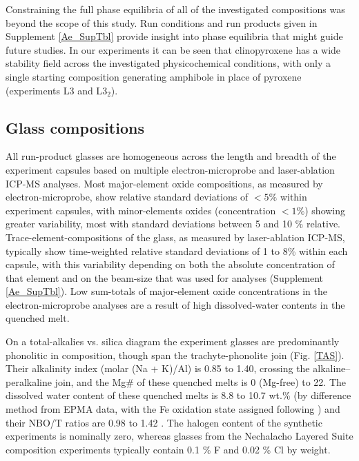 \documentclass[final,authoryear,3p,times,twocolumn]{elsarticle}
\begin{document}
Constraining the full phase equilibria of all of the investigated compositions was beyond the scope of this study. Run conditions and run products given in Supplement \ref{Ae_SupTbl} provide insight into phase equilibria that might guide future studies. In our experiments it can be seen that clinopyroxene has a wide stability field across the investigated physicochemical conditions, with only a single starting composition generating amphibole in place of pyroxene (experiments L3 and L$3_2$).

\subsection{Glass compositions}

All run-product glasses are homogeneous across the length and breadth of the experiment capsules based on multiple electron-microprobe and laser-ablation ICP-MS analyses. Most major-element oxide compositions, as measured by electron-microprobe, show relative standard deviations of $<5\%$ within experiment capsules, with minor-elements oxides (concentration $<1\%$) showing greater variability, most with standard deviations between 5 and 10 \% relative. Trace-element-compositions of the glass, as measured by laser-ablation ICP-MS, typically show time-weighted relative standard deviations of 1 to 8\% within each capsule, with this variability depending on both the absolute concentration of that element and on the beam-size that was used for analyses (Supplement \ref{Ae_SupTbl}). Low sum-totals of major-element oxide concentrations in the electron-microprobe analyses are a result of high dissolved-water contents in the quenched melt.

On a total-alkalies vs. silica diagram the experiment glasses are predominantly phonolitic in composition, though span the trachyte-phonolite join (Fig. \ref{TAS}). 
Their alkalinity index (molar (Na + K)/Al) is 0.85 to 1.40, crossing the alkaline--peralkaline join, and the Mg\# of these quenched melts is 0 (Mg-free) to 22. The dissolved water content of these quenched melts is 8.8 to 10.7 wt.\% (by difference method from EPMA data, with the Fe oxidation state assigned following \citealt{Kress1991}) and their NBO/T ratios are 0.98 to 1.42 \citep{Mysen1982,Mysen1985}. The halogen content of the synthetic experiments is nominally zero, whereas glasses from the Nechalacho Layered Suite composition experiments typically contain 0.1 \% F and 0.02 \% Cl by weight.
\end{document}
